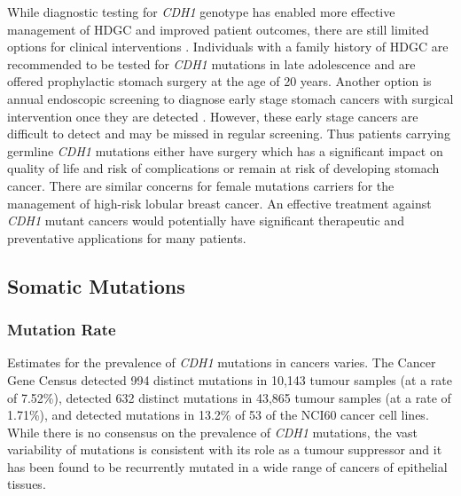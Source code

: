 While diagnostic testing for \textit{CDH1} genotype has enabled more effective management of \gls{HDGC} and improved patient outcomes, there are still limited options for clinical interventions \citep{Guilford2010}. Individuals with a family history of \gls{HDGC} are recommended to be tested for \textit{CDH1} \glspl{mutation} in late adolescence and are offered prophylactic stomach surgery at the age of 20 years. %
Another option is annual endoscopic screening to diagnose early stage stomach cancers with surgical intervention once they are detected \citep{Oliveira2013}. However, these early stage cancers are difficult to detect and may be missed in regular screening. Thus patients carrying germline \textit{CDH1} \glspl{mutation} either have surgery which has a significant impact on quality of life and risk of complications or remain at risk of developing stomach \gls{cancer}. %
There are similar concerns for female \glspl{mutation} carriers for the management of high-risk lobular breast \gls{cancer}.
%
An effective treatment against \textit{CDH1} \gls{mutant} cancers would potentially have significant therapeutic and preventative applications for many patients.

\iffalse
\subsection{Somatic Mutations}
\subsubsection{Mutation Rate}

Estimates for the prevalence of \textit{CDH1}  \glspl{mutation}  in  cancers varies. The Cancer Gene Census \citep{Futreal2004, Pleasance2010} detected 994 distinct \glspl{mutation} in 10,143 tumour samples (at a rate of 7.52\%), \citet{COSMICdb} detected 632 distinct \glspl{mutation} in 43,865 tumour samples (at a rate of 1.71\%), and detected \glspl{mutation} in 13.2\% of 53 of the NCI60 cancer cell lines. While there is no consensus on the prevalence of \textit{CDH1} \glspl{mutation}, the vast variability of \glspl{mutation} is consistent with its role as a \gls{tumour suppressor} and it has been found to be recurrently mutated in a wide range of cancers of epithelial tissues.

